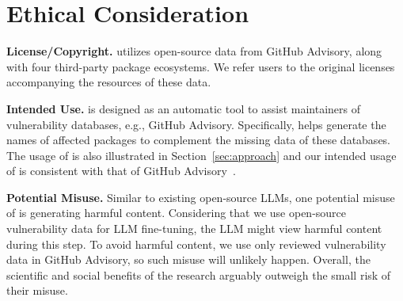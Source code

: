

\section{Ethical Consideration}

\noindent \textbf{License/Copyright.}
\detector{} utilizes open-source data from GitHub Advisory, along with four third-party package ecosystems.
We refer users to the original licenses accompanying the resources of these data.

\noindent \textbf{Intended Use.}
\detector{} is designed as an automatic tool to assist maintainers of vulnerability databases, e.g., GitHub Advisory.
Specifically, \detector{} helps generate the names of affected packages to complement the missing data of these databases.
The usage of \detector{} is also illustrated in Section~\ref{sec:approach} and our intended usage of \detector{} is consistent with that of GitHub Advisory~\cite{githubAD}.

\noindent \textbf{Potential Misuse.}
Similar to existing open-source LLMs, one potential misuse of \detector{} is generating harmful content.
Considering that we use open-source vulnerability data for LLM fine-tuning, the LLM might view harmful content during this step.
To avoid harmful content, we use only reviewed vulnerability data in GitHub Advisory, so such misuse will unlikely happen. 
Overall, the scientific and social benefits of the research arguably outweigh the small risk of their misuse.





